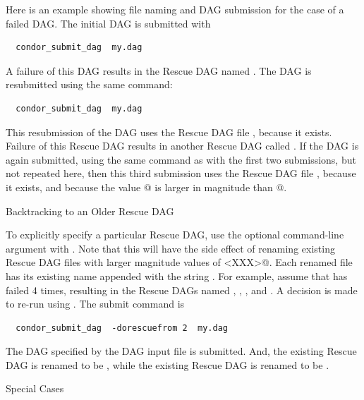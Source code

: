 Here is an example showing file naming and DAG submission
for the case of a failed DAG.
The initial DAG is submitted with
\begin{verbatim}
  condor_submit_dag  my.dag
\end{verbatim}
A failure of this DAG results in the Rescue DAG
named .
The DAG is resubmitted using the same command: 
\begin{verbatim}
  condor_submit_dag  my.dag
\end{verbatim}
This resubmission of the DAG uses the Rescue DAG file ,
because it exists.
Failure of this Rescue DAG results in another Rescue DAG
called .
If the DAG is again submitted, using the same command
as with the first two submissions, but not repeated here,
then this third submission uses the Rescue DAG file ,
because it exists, and because the value @ is larger
in magnitude than @.

\label{dagman:rescue_dag_backtracking}
\begin{description}
\item[Backtracking to an Older Rescue DAG]
\end{description}

To explicitly specify a particular Rescue DAG,
use the optional command-line argument 
with .
Note that this will have the side effect of renaming 
existing Rescue DAG files with larger magnitude values 
of \verb@<XXX>@.
Each renamed file has its existing name appended with
the string .
For example, assume that  has failed 4 times,
resulting in the Rescue DAGs named
,
,
,
and
.
A decision is made to re-run using .
The submit command is
\begin{verbatim}
  condor_submit_dag  -dorescuefrom 2  my.dag
\end{verbatim}
The DAG specified by the DAG input file 
is submitted.
And, the existing Rescue DAG  is
renamed to be ,
while the existing Rescue DAG  is
renamed to be .

\label{dagman:rescue_special_cases}
\begin{description}
\item[Special Cases]
\end{description}

